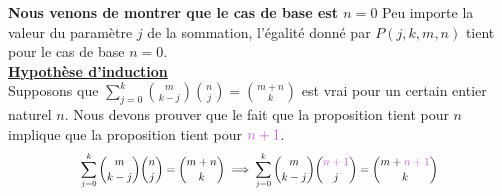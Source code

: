 \documentclass[16pt]{report}
\begin{document}
\begin{multicols*}{2}
\begin{Preuve*}{}{}
        \textbf{Nous venons de montrer que le cas de base est $n = 0$} Peu importe la valeur 
        du paramètre $j$ de la sommation, l'égalité donné par $P(j, k, m, n)$ tient pour 
        le cas de base $n = 0$. 
        \vspace{1em} \\ 
        \underline{\textbf{Hypothèse d'induction}}\\
        Supposons que 
        $\sum_{j=0}^{k} {m \choose k-j} {n \choose j} = {m+n \choose k}$ est vrai
        pour un certain entier naturel $n$. Nous devons prouver 
        que le fait que la proposition tient pour $n$ implique que la proposition tient 
        pour $\textcolor{myp}{n+1}$. 
        \[\scalemath{0.8}{\sum_{j=0}^{k} {m \choose k-j} {n \choose j} = {m+n \choose k} \implies 
        \sum_{j=0}^{k} {m \choose k-j} {\textcolor{myp}{n+1}   \choose j} = {m+ \textcolor{myp}{n+1}\choose k}}\]


\end{Preuve*}
\end{multicols*}
\end{document}

